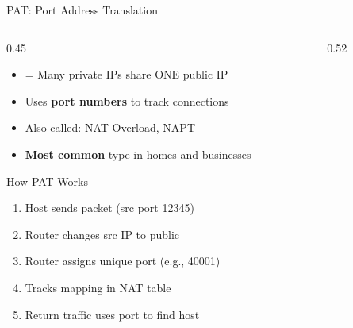 \documentclass[aspectratio=169]{beamer}  %
\begin{document}
\begin{frame}{PAT: Port Address Translation}
    \begin{columns}[T]
        \begin{column}{0.45\textwidth}
            \begin{itemize}
                \item {} = Many private IPs share ONE public IP
                \item Uses \textbf{port numbers} to track connections
                \item Also called: NAT Overload, NAPT
                \item \textbf{Most common} type in homes and businesses
            \end{itemize}
            
            \vspace{0.2em}
            \begin{block}{How PAT Works}
                \small
                \begin{enumerate}\setlength{\itemsep}{1pt}
                    \item Host sends packet (src port 12345)
                    \item Router changes src IP to public
                    \item Router assigns unique port (e.g., 40001)
                    \item Tracks mapping in NAT table
                    \item Return traffic uses port to find host
                \end{enumerate}
            \end{block}
        \end{column}
        \begin{column}{0.52\textwidth}
            \begin{center}
\end{center}
\end{column}
\end{columns}
\end{frame}
\end{document}
